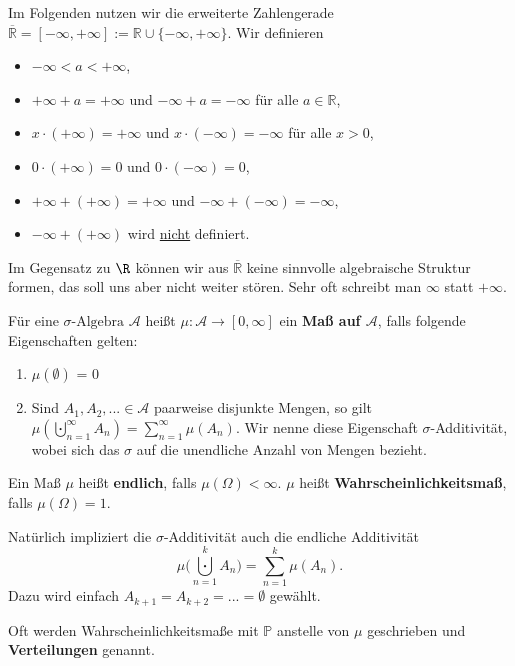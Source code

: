 \begin{bem1}

Im Folgenden nutzen wir die erweiterte Zahlengerade $\overline{\mathbb{R}} = [-\infty, +\infty] := \mathbb{R} \cup \{ -\infty, +\infty \}$. Wir definieren
\begin{itemize}
	\item $-\infty < a < +\infty$,
	\item $+\infty + a = +\infty$ und $-\infty + a = -\infty$ f\"ur alle $ a \in \mathbb{R}$,
	\item $x \cdot (+\infty)=+\infty$ und $x \cdot (-\infty)=-\infty$ f\"ur alle $x>0$,
	\item $0\cdot (+\infty)=0$ und $0\cdot (-\infty)=0$,
	\item $+\infty+(+\infty)=+\infty$ und $-\infty+(-\infty)=-\infty$,
	\item $-\infty+(+\infty)$ wird \underline{nicht} definiert.
\end{itemize}	
	 Im Gegensatz zu $\R$ k\"onnen wir aus $\overline{\mathbb{R}}$ keine sinnvolle algebraische Struktur formen, das soll uns aber nicht weiter st\"oren. Sehr oft schreibt man $\infty$ statt $+\infty$.
\end{bem1}


\begin{deff}
Für eine $\sigma\text{-Algebra } \mathcal{A}$ heißt $\mu \! : \mathcal{A} \longrightarrow [0, \infty]$ ein \textbf{Maß auf $\mathcal{A}$}, falls folgende Eigenschaften gelten:
\begin{enumerate}[label=(\roman*)]
	\item $\mu (\emptyset)$ = 0
	\item Sind $A_{1}, A_{2},...\in \mathcal{A}$ paarweise disjunkte Mengen, so gilt $\mu(\bigcupdot\limits_{n=1}^{\infty}A_{n})=\sum\limits_{n=1}^{\infty}\mu (A_{n})$. Wir nenne diese Eigenschaft $\sigma$-Additivität, wobei sich das $\sigma$ auf die unendliche Anzahl von Mengen bezieht. 
\end{enumerate}

Ein Ma\ss{} $\mu$ heißt \textbf{endlich}, falls $\mu (\Omega) < \infty$. $\mu$ heißt \textbf{Wahrscheinlichkeitsmaß}, falls $\mu (\Omega) = 1$.
\end{deff}
Nat\"urlich impliziert die $\sigma$-Additivit\"at auch die endliche Additivit\"at $$\mu\Big(\bigcupdot\limits_{n=1}^{k}A_{n}\Big)=\sum\limits_{n=1}^{k}\mu (A_{n}).$$ Dazu wird einfach $A_{k+1}=A_{k+2}=...=\emptyset$ gew\"ahlt.


\begin{bem}

Oft werden Wahrscheinlichkeitsmaße mit $\mathbb P$ anstelle von $\mu$ geschrieben und \textbf{Verteilungen} genannt.

\end{bem}

